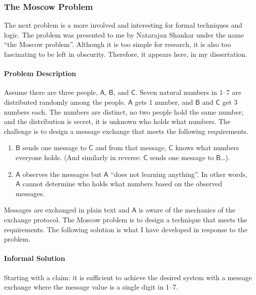 \subsubsection{The Moscow Problem}
\label{subsec:moscow}

The next problem is a more involved and interesting for formal techniques and
logic. The problem was presented to me by Natarajan Shankar under the name
\enquote{the Moscow problem}. Although it is too simple for research, it is also
too fascinating to be left in obscurity. Therefore, it appears here, in my
dissertation.

\paragraph*{Problem Description}
Assume there are three people, \(\mathsf{A}\), \(\mathsf{B}\), and
\(\mathsf{C}\)\@. Seven natural numbers in 1--7 are distributed randomly among
the people. \(\mathsf{A}\) gets 1 number, and \(\mathsf{B}\) and \(\mathsf{C}\)
get 3 numbers each. The numbers are distinct, \ie no two people hold the same
number; and the distribution is secret, \ie it is unknown who holds what
numbers. The challenge is to design a message exchange that meets the following
requirements.

\begin{enumerate}

\item \(\mathsf{B}\) sends one message to \(\mathsf{C}\) and from that message,
\(\mathsf{C}\) knows what numbers everyone holds. (And similarly in reverse:
\(\mathsf{C}\) sends one message to \(\mathsf{B}\)\ldots).

\item \(\mathsf{A}\) observes the messages but \(\mathsf{A}\) \enquote{does not
learning anything}. In other words, \(\mathsf{A}\) cannot determine who holds
what numbers based on the observed messages.

\end{enumerate}

Messages are exchanged in plain text and \(\mathsf{A}\) is aware of the
mechanics of the exchange protocol. The Moscow problem is to design a technique
that meets the requirements. The following solution is what I have developed in
response to the problem.

\paragraph*{Informal Solution}
Starting with a claim: it is sufficient to achieve the desired system with a
message exchange where the message value is a single digit in 1--7.

